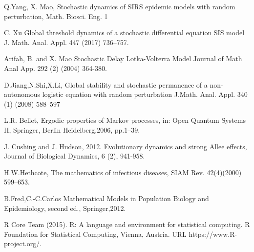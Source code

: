 \begin{thebibliography}{00}
 Q.Yang, X. Mao,
\newblock Stochastic dynamics of SIRS epidemic models with random perturbation,
\newblock Math. Biosci. Eng. 1

 C. Xu
\newblock Global threshold dynamics of a stochastic differential equation SIS model
\newblock J. Math. Anal. Appl. 447 (2017) 736–757.

Arifah, B. and X. Mao 
\newblock Stochastic Delay Lotka-Volterra Model 
\newblock Journal of Math Anal App. 292 (2) (2004) 364-380.

 D.Jiang,N.Shi,X.Li,
\newblock Global stability and stochastic permanence of a non-autonomous logistic equation with random perturbation
\newblock J.Math. Anal. Appl. 340 (1) (2008) 588–597

L.R. Bellet,
\newblock Ergodic properties of Markov processes, in: Open Quantum Systems II,
\newblock Springer, Berlin Heidelberg,2006, pp.1–39.

 J. Cushing and J. Hudson, 2012. 
\newblock Evolutionary dynamics and strong Allee effects,
\newblock Journal  of  Biological Dynamics, 6 (2), 941-958.

H.W.Hethcote,
\newblock The mathematics of infectious diseases,
\newblock SIAM Rev. 42(4)(2000) 599–653.

B.Fred,C.-C.Carlos
\newblock Mathematical Models in Population Biology and Epidemiology,
\newblock second ed., Springer,2012.

R Core Team (2015). 
\newblock R: A language and environment for statistical computing. R Foundation for Statistical Computing, Vienna, Austria.
\newblock URL https://www.R-project.org/.

\end{thebibliography}

